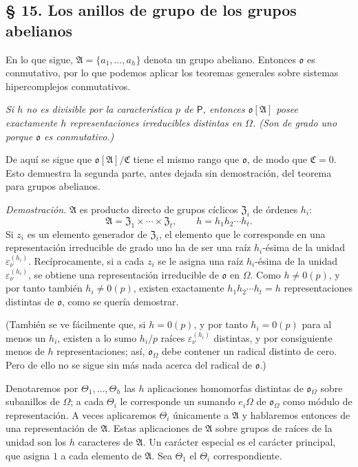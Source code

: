 \subsection*{§ 15. Los anillos de grupo de los grupos abelianos}\label{los-anillos-de-grupo-de-los-grupos-abelianos}

En lo que sigue, \(\mathfrak A=\{a_1,\ldots,a_h\}\) denota un grupo abeliano. Entonces \(\mathfrak o\) es conmutativo, por lo que podemos aplicar los teoremas generales sobre sistemas hipercomplejos conmutativos.

\emph{Si \(h\) no es divisible por la característica \(p\) de \(\mathsf P\), entonces \(\mathfrak o[\mathfrak A]\) posee exactamente \(h\) representaciones irreducibles distintas en \(\Omega\). (Son de grado uno porque \(\mathfrak o\) es conmutativo.)}

De aquí se sigue que \(\mathfrak o[\mathfrak A]/\mathfrak C\) tiene el mismo rango que \(\mathfrak o\), de modo que \(\mathfrak C=0\). Esto demuestra la segunda parte, antes dejada sin demostración, del teorema para grupos abelianos.

\emph{Demostración.} \(\mathfrak A\) es producto directo de grupos cíclicos \(\mathfrak Z_i\) de órdenes \(h_i\):
\[
\mathfrak A=\mathfrak Z_1\times\cdots\times\mathfrak Z_t,
\qquad h=h_1h_2\cdots h_t.
\]
Si \(z_i\) es un elemento generador de \(\mathfrak Z_i\), el elemento que le corresponde en una representación irreducible de grado uno ha de ser una raíz \(h_i\)-ésima de la unidad \(\varepsilon_\nu^{(h_i)}\). Recíprocamente, si a cada \(z_i\) se le asigna una raíz \(h_i\)-ésima de la unidad \(\varepsilon_\nu^{(h_i)}\), se obtiene una representación irreducible de \(\mathfrak o\) en \(\Omega\). Como \(h\ne0(p)\), y por tanto también \(h_i\ne0(p)\), existen exactamente \(h_1h_2\cdots h_t=h\) representaciones distintas de \(\mathfrak o\), como se quería demostrar.

(También se ve fácilmente que, si \(h=0(p)\), y por tanto \(h_i=0(p)\) para al menos un \(h_i\), existen a lo sumo \(h_i/p\) raíces \(\varepsilon_\nu^{(h_i)}\) distintas, y por consiguiente menos de \(h\) representaciones; así, \(\mathfrak o_\Omega\) debe contener un radical distinto de cero. Pero de ello no se sigue sin más nada acerca del radical de \(\mathfrak o\).)

Denotaremos por \(\Theta_1,\ldots,\Theta_h\) las \(h\) aplicaciones homomorfas distintas de \(\mathfrak o_\Omega\) sobre subanillos de \(\Omega\); a cada \(\Theta_i\) le corresponde un sumando \(e_i\Omega\) de \(\mathfrak o_\Omega\) como módulo de representación. A veces aplicaremos \(\Theta_i\) únicamente a \(\mathfrak A\) y hablaremos entonces de una representación de \(\mathfrak A\). Estas aplicaciones de \(\mathfrak A\) sobre grupos de raíces de la unidad son los \(h\) caracteres de \(\mathfrak A\). Un carácter especial es el carácter principal, que asigna \(1\) a cada elemento de \(\mathfrak A\). Sea \(\Theta_1\) el \(\Theta_i\) correspondiente.


